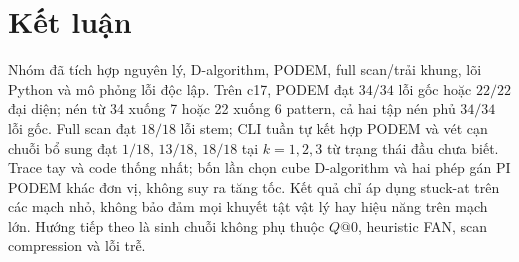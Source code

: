 \chapter{Kết luận}
\label{sec:p1-ket-luan}
Nhóm đã tích hợp nguyên lý, D-algorithm, PODEM, full scan/trải khung,
lõi Python và mô phỏng lỗi độc lập. Trên c17, PODEM đạt $34/34$ lỗi gốc
hoặc $22/22$ đại diện; nén từ 34 xuống 7 hoặc 22 xuống 6 pattern,
cả hai tập nén phủ $34/34$ lỗi gốc. Full scan đạt $18/18$ lỗi stem;
CLI tuần tự kết hợp PODEM và vét cạn chuỗi bổ sung đạt $1/18$, $13/18$,
$18/18$ tại $k=1,2,3$ từ trạng thái đầu chưa biết.
Trace tay và code thống nhất; bốn lần chọn cube D-algorithm và hai phép
gán PI PODEM khác đơn vị, không suy ra tăng tốc.
Kết quả chỉ áp dụng stuck-at trên các mạch nhỏ, không bảo đảm mọi khuyết
tật vật lý hay hiệu năng trên mạch lớn. Hướng tiếp theo là sinh chuỗi
không phụ thuộc $Q@0$, heuristic FAN, scan compression và lỗi trễ.
